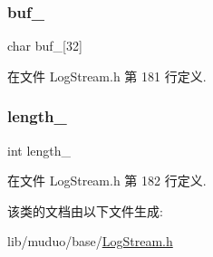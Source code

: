 \subsubsection{\texorpdfstring{buf\+\_\+}{buf\_}}
{\footnotesize\ttfamily char buf\+\_\+\mbox{[}32\mbox{]}\hspace{0.3cm}{\ttfamily [private]}}



在文件 Log\+Stream.\+h 第 181 行定义.

\mbox{\label{classmuduo_1_1Fmt_a4bac9b810d0cf891c8fcbc974e989739}} 
\subsubsection{\texorpdfstring{length\+\_\+}{length\_}}
{\footnotesize\ttfamily int length\+\_\+\hspace{0.3cm}{\ttfamily [private]}}



在文件 Log\+Stream.\+h 第 182 行定义.



该类的文档由以下文件生成\+:\begin{DoxyCompactItemize}
\item 
lib/muduo/base/\hyperlink{LogStream_8h}{Log\+Stream.\+h}\end{DoxyCompactItemize}
